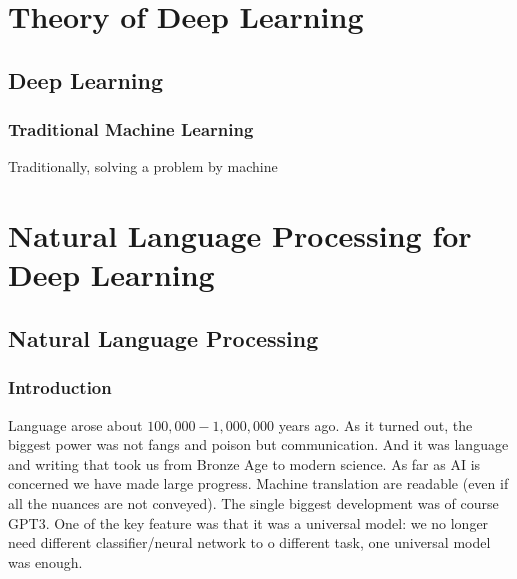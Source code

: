 \documentclass[a4paper,oneside]{book}
\begin{document}
\begin{titlepage}
    
\end{titlepage}
\clearpage
\newpage
\newpage

\tableofcontents


\part{Theory of Deep Learning}

\restoregeometry


\chapter{Deep Learning}
    \begin{marginfigure}%
    \end{marginfigure}%
\section{Traditional Machine Learning}
    Traditionally, solving a problem by machine 









\part{Natural Language Processing for Deep Learning}

\restoregeometry


\chapter{Natural Language Processing}

\section{Introduction}

    Language arose about $100,000-1,000,000$ years ago. As it turned out, the biggest power was not fangs and poison but communication. And it was language and writing that took us from Bronze Age to modern science. As far as AI is concerned we have made large progress. Machine translation are readable (even if all the nuances are not conveyed). The single biggest development was of course GPT3. One of the key feature was that it was a universal model: we no longer need different classifier/neural network to o different task, one universal model was enough.
\end{document}
